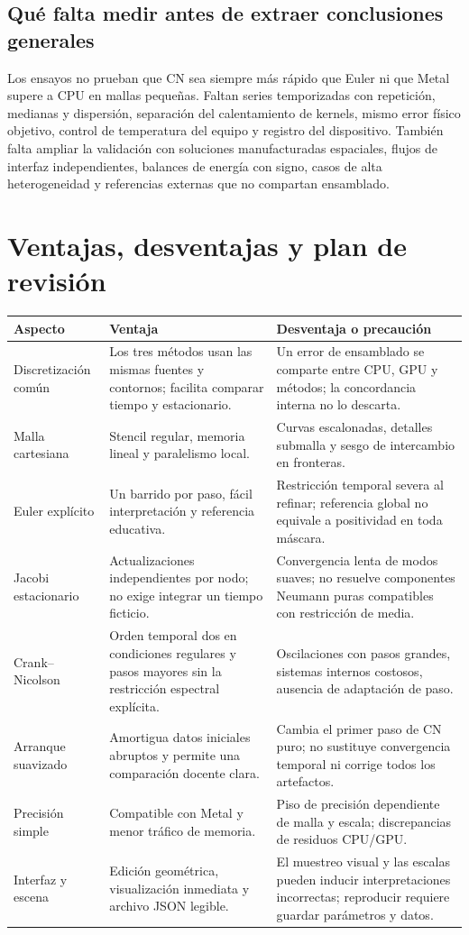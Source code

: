 \documentclass[11pt,a4paper]{article}
\begin{document}
\subsection{Qué falta medir antes de extraer conclusiones generales}
Los ensayos no prueban que CN sea siempre más rápido que Euler ni que Metal
supere a CPU en mallas pequeñas. Faltan series temporizadas con repetición,
medianas y dispersión, separación del calentamiento de kernels, mismo error
físico objetivo, control de temperatura del equipo y registro del dispositivo.
También falta ampliar la validación con soluciones manufacturadas espaciales,
flujos de interfaz independientes, balances de energía con signo, casos de
alta heterogeneidad y referencias externas que no compartan ensamblado.

\FloatBarrier
\section{Ventajas, desventajas y plan de revisión}
\label{sec:discussion}
\begin{longtable}{@{}p{.19\linewidth}p{.35\linewidth}p{.38\linewidth}@{}}
\toprule
Aspecto & Ventaja & Desventaja o precaución\\\midrule\endhead
Discretización común & Los tres métodos usan las mismas fuentes y contornos; facilita comparar tiempo y estacionario. & Un error de ensamblado se comparte entre CPU, GPU y métodos; la concordancia interna no lo descarta.\\
Malla cartesiana & Stencil regular, memoria lineal y paralelismo local. & Curvas escalonadas, detalles submalla y sesgo de intercambio en fronteras.\\
Euler explícito & Un barrido por paso, fácil interpretación y referencia educativa. & Restricción temporal severa al refinar; referencia global no equivale a positividad en toda máscara.\\
Jacobi estacionario & Actualizaciones independientes por nodo; no exige integrar un tiempo ficticio. & Convergencia lenta de modos suaves; no resuelve componentes Neumann puras compatibles con restricción de media.\\
Crank--Nicolson & Orden temporal dos en condiciones regulares y pasos mayores sin la restricción espectral explícita. & Oscilaciones con pasos grandes, sistemas internos costosos, ausencia de adaptación de paso.\\
Arranque suavizado & Amortigua datos iniciales abruptos y permite una comparación docente clara. & Cambia el primer paso de CN puro; no sustituye convergencia temporal ni corrige todos los artefactos.\\
Precisión simple & Compatible con Metal y menor tráfico de memoria. & Piso de precisión dependiente de malla y escala; discrepancias de residuos CPU/GPU.\\
Interfaz y escena & Edición geométrica, visualización inmediata y archivo JSON legible. & El muestreo visual y las escalas pueden inducir interpretaciones incorrectas; reproducir requiere guardar parámetros y datos.\\
\bottomrule
\end{longtable}
\end{document}
